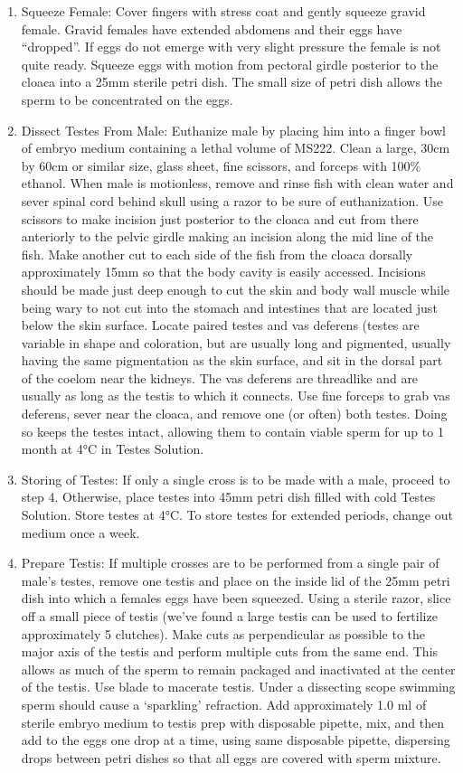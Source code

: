 \documentclass[
]{book}
\providecommand{\tightlist}{%
  \setlength{\itemsep}{0pt}\setlength{\parskip}{0pt}}
\begin{document}
\begin{enumerate}
\def\labelenumi{\arabic{enumi}.}
\tightlist
\item
  Squeeze Female: Cover fingers with stress coat and gently squeeze gravid female. Gravid females have extended abdomens and their eggs have ``dropped''. If eggs do not emerge with very slight pressure the female is not quite ready. Squeeze eggs with motion from pectoral girdle posterior to the cloaca into a 25mm sterile petri dish. The small size of petri dish allows the sperm to be concentrated on the eggs.
\item
  Dissect Testes From Male: Euthanize male by placing him into a finger bowl of embryo medium containing a lethal volume of MS222. Clean a large, 30cm by 60cm or similar size, glass sheet, fine scissors, and forceps with 100\% ethanol. When male is motionless, remove and rinse fish with clean water and sever spinal cord behind skull using a razor to be sure of euthanization. Use scissors to make incision just posterior to the cloaca and cut from there anteriorly to the pelvic girdle making an incision along the mid line of the fish. Make another cut to each side of the fish from the cloaca dorsally approximately 15mm so that the body cavity is easily accessed. Incisions should be made just deep enough to cut the skin and body wall muscle while being wary to not cut into the stomach and intestines that are located just below the skin surface. Locate paired testes and vas deferens (testes are variable in shape and coloration, but are usually long and pigmented, usually having the same pigmentation as the skin surface, and sit in the dorsal part of the coelom near the kidneys. The vas deferens are threadlike and are usually as long as the testis to which it connects. Use fine forceps to grab vas deferens, sever near the cloaca, and remove one (or often) both testes. Doing so keeps the testes intact, allowing them to contain viable sperm for up to 1 month at 4°C in Testes Solution.
\item
  Storing of Testes: If only a single cross is to be made with a male, proceed to step 4. Otherwise, place testes into 45mm petri dish filled with cold Testes Solution. Store testes at 4°C. To store testes for extended periods, change out medium once a week.
\item
  Prepare Testis: If multiple crosses are to be performed from a single pair of male's testes, remove one testis and place on the inside lid of the 25mm petri dish into which a females eggs have been squeezed. Using a sterile razor, slice off a small piece of testis (we've found a large testis can be used to fertilize approximately 5 clutches). Make cuts as perpendicular as possible to the major axis of the testis and perform multiple cuts from the same end. This allows as much of the sperm to remain packaged and inactivated at the center of the testis. Use blade to macerate testis. Under a dissecting scope swimming sperm should cause a `sparkling' refraction. Add approximately 1.0 ml of sterile embryo medium to testis prep with disposable pipette, mix, and then add to the eggs one drop at a time, using same disposable pipette, dispersing drops between petri dishes so that all eggs are covered with sperm mixture.

\end{enumerate}
\end{document}
